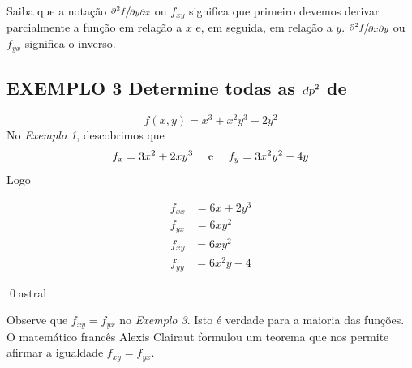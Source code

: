 \documentclass[a4paper, 12pt]{extreport}
\begin{document}
      Saiba que a notação {\large$\sfrac{\partial^2f}{\partial y\partial x}$} ou $f_{xy}$ significa que primeiro devemos derivar parcialmente a função em relação a $x$ e,
      em seguida, em relação a $y$. {\large$\sfrac{\partial^2f}{\partial x\partial y}$} ou $f_{yx}$ significa o inverso.

      \subsection*{\small {\color{astral}EXEMPLO 3} \textmd{Determine todas as $\textsl{dp}^2$ de}}
        \vspace{-5mm}
        $$ f(x,y) = x^3 + x^2y^3 - 2y^2 $$
        No \textsl{Exemplo 1}, descobrimos que
        $$ f_x = 3x^2 + 2xy^3 \ \ \ \ \textup{e} \ \ \ \ f_y = 3x^2y^2 - 4y $$
        Logo
        \begin{multicols}{2}
          \noindent
          \begin{equation*}
            \begin{split}
              f_{xx} & = 6x + 2y^3 \\
              f_{yx} & = 6xy^2
            \end{split}
          \end{equation*}
          \begin{equation*}
            \begin{split}
              f_{xy} & = 6xy^2 \\
              f_{yy} & = 6x^2y - 4
            \end{split}
          \end{equation*}
        \end{multicols}
        \qed{astral}

        Observe que $f_{xy} = f_{yx}$ no \textsl{Exemplo 3}. Isto é verdade para a maioria das funções.
        O matemático francês Alexis Clairaut formulou um teorema que nos permite afirmar a igualdade $f_{xy} = f_{yx}$.

        \vspace{4mm}
        \noindent {}
\end{document}
